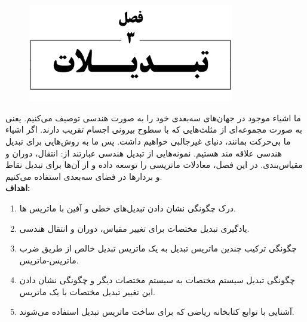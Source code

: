 \newpage

\setcounter{chapter}{3}
\setcounter{example}{0}
\setcounter{eqtn}{0}
\setcounter{section}{0}


\chapter{}
\textbf{\vspace{-150pt}}
\begin{figure}[H]
    \centering
    \setlength{\belowcaptionskip}{-10pt}
    \includegraphics[width=0.8\textwidth]{Images/4/3/4.Session.1.3.0}
    \label{fig:4.Session.1.3.0}
\end{figure}
\textbf{\vspace{10pt}}
{
    \Large
    \begin{spacing}{1.5}
        ما اشیاء موجود در جهان‌های سه‌بعدی خود را به صورت هندسی توصیف می‌کنیم.
        یعنی به صورت مجموعه‌ای از مثلث‌هایی که با سطوح بیرونی اجسام تقریب دارند.
        اگر اشیاء ما بی‌حرکت بمانند، دنیای غیر‌جالبی خواهیم داشت.
        پس ما به روش‌هایی برای تبدیل هندسی علاقه مند هستیم.
        نمونه‌هایی از تبدیل هندسی عبارتند از: انتقال، دوران و مقیاس‌بندی.
        در این فصل، معادلات ماتریسی را توسعه داده و از آن‌ها برای تبدیل نقاط و بردارها در فضای سه‌بعدی استفاده می‌کنیم.
        \\

        \textbf{\LARGE \hspace{-40pt}اهداف:}
        \begin{enumerate}[label=\textbf{\arabic*}.]
            \item {درک چگونگی نشان دادن تبدیل‌های خطی و آفین با ماتریس ها.}
            \item {یادگیری تبدیل مختصات برای تغییر مقیاس، دوران و انتقال هندسی.}
            \item {چگونگی ترکیب چندین ماتریس تبدیل به یک ماتریس تبدیل خالص از طریق ضرب ماتریس-ماتریس.}
            \item {چگونگی تبدیل سیستم مختصات به سیستم مختصات دیگر و چگونگی نشان دادن این تغییر تبدیل مختصات با یک ماتریس.}
            \item {آشنایی با توابع کتابخانه ریاضی  که برای ساخت ماتریس تبدیل استفاده می‌شوند.}
        \end{enumerate}
    \end{spacing}
}
\newpage

